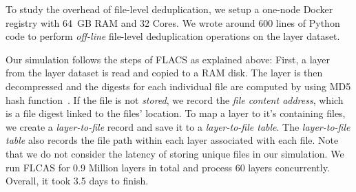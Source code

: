 
To study the overhead of file-level deduplication, we setup a
one-node Docker registry with 64~GB RAM and 32 Cores.  
%
We wrote around 600 lines of Python code to perform \emph{off-line} file-level deduplication
operations on the layer dataset.
%

% 

Our simulation follows the steps of FLACS as explained above:
First, a layer from the layer dataset is read and copied
to a RAM disk. The layer is then decompressed and 
the digests for each individual file are computed by using MD5 hash function~\cite{MD5}.
%
If the file is not \emph{stored},
we record the \emph{file content address}, which is a
file digest linked to the files' location.
%
To map a layer to it's containing files, we create a \emph{layer-to-file} record
and save it
to a \emph{layer-to-file table}.
%
The \emph{layer-to-file table} also
records the file path within each layer associated with each file.
%
Note that we do not consider the latency of storing unique files in our simulation.
%
%
We run FLCAS for 0.9 Million layers in total and process 60 layers concurrently. 
%
Overall, it took 3.5 days to finish.
%
%

